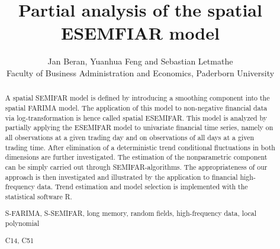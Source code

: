 \documentclass[12pt]{article}
\begin{document}
\title{Partial analysis of the spatial ESEMFIAR model}
\author{Jan Beran, Yuanhua Feng and Sebastian Letmathe\\ Faculty of Business Administration and Economics,
Paderborn University}
\maketitle


\begin{abstract}

\noindent 
 A  spatial SEMIFAR model is defined by introducing a smoothing component into the spatial FARIMA model. The application of this model to non-negative financial data via log-transformation is hence called spatial ESEMIFAR. This model is analyzed by partially applying the ESEMIFAR model to univariate financial time series, namely on all observations at a given trading day and on observations of all days at a given trading time. After elimination of a deterministic trend conditional fluctuations in both dimensions are further investigated. The estimation of the nonparametric component can be simply carried out through SEMIFAR-algorithms. The appropriateness of our approach is then investigated and illustrated by the application to financial high-frequency data. Trend estimation and model selection is implemented with the statistical software R. 
 
\vspace{.3cm}

  S-FARIMA, S-SEMIFAR, long memory, random fields, high-frequency data, local polynomial


\vspace{.3cm}

 C14, C51
\end{abstract}
\newpage
\end{document}
